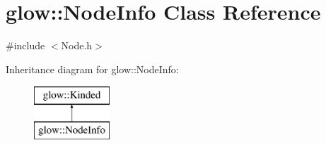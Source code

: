 \hypertarget{classglow_1_1_node_info}{}\section{glow\+:\+:Node\+Info Class Reference}
\label{classglow_1_1_node_info}


{\ttfamily \#include $<$Node.\+h$>$}

Inheritance diagram for glow\+:\+:Node\+Info\+:\begin{figure}[H]
\begin{center}
\leavevmode
\includegraphics[height=2.000000cm]{classglow_1_1_node_info}
\end{center}
\end{figure}
